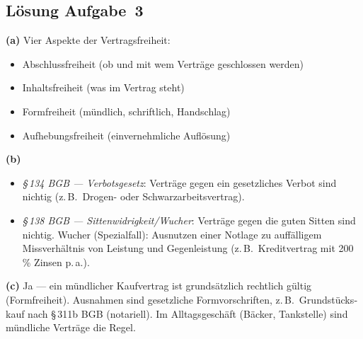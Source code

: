 \documentclass[11pt, a4paper]{article}
\begin{document}
\subsection*{Lösung Aufgabe~3}
\begin{loesung}
\textbf{(a)} Vier Aspekte der Vertragsfreiheit:
\begin{itemize}[itemsep=0pt]
  \item Abschlussfreiheit (ob und mit wem Verträge geschlossen werden)
  \item Inhaltsfreiheit (was im Vertrag steht)
  \item Formfreiheit (mündlich, schriftlich, Handschlag)
  \item Aufhebungsfreiheit (einvernehmliche Auflösung)
\end{itemize}

\textbf{(b)}
\begin{itemize}[itemsep=0pt]
  \item \emph{§\,134 BGB --- Verbotsgesetz}: Verträge gegen ein gesetzliches Verbot sind nichtig (z.\,B.\ Drogen- oder Schwarzarbeitsvertrag).
  \item \emph{§\,138 BGB --- Sittenwidrigkeit/Wucher}: Verträge gegen die guten Sitten sind nichtig. Wucher (Spezialfall): Ausnutzen einer Notlage zu auffälligem Missverhältnis von Leistung und Gegenleistung (z.\,B.\ Kreditvertrag mit 200\,\% Zinsen p.\,a.).
\end{itemize}

\textbf{(c)} Ja --- ein mündlicher Kaufvertrag ist grundsätzlich rechtlich gültig
(Formfreiheit). Ausnahmen sind gesetzliche Form­vorschriften, z.\,B.\ Grundstücks­kauf
nach §\,311b BGB (notariell). Im Alltagsgeschäft (Bäcker, Tankstelle) sind mündliche
Verträge die Regel.
\end{loesung}
\end{document}
